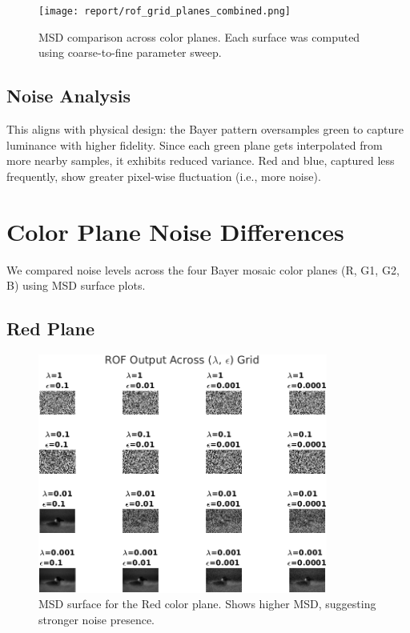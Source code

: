 \documentclass[11pt]{article}
\begin{document}
\begin{figure}[h!]
\centering
\texttt{[image: report/rof\_grid\_planes\_combined.png]}
\caption{MSD comparison across color planes. Each surface was computed using coarse-to-fine parameter sweep.}
\end{figure}

\subsection*{Noise Analysis}
This aligns with physical design: the Bayer pattern oversamples green to capture luminance with higher fidelity. Since each green plane gets interpolated from more nearby samples, it exhibits reduced variance. Red and blue, captured less frequently, show greater pixel-wise fluctuation (i.e., more noise).



\section*{Color Plane Noise Differences}

We compared noise levels across the four Bayer mosaic color planes (R, G1, G2, B) using MSD surface plots.

\subsection*{Red Plane}
\begin{figure}[h!]
\centering
\includegraphics[width=0.85\textwidth]{../test/results/rof_grid_plane_R.png}
\caption{MSD surface for the Red color plane. Shows higher MSD, suggesting stronger noise presence.}
\end{figure}
\clearpage
\end{document}
